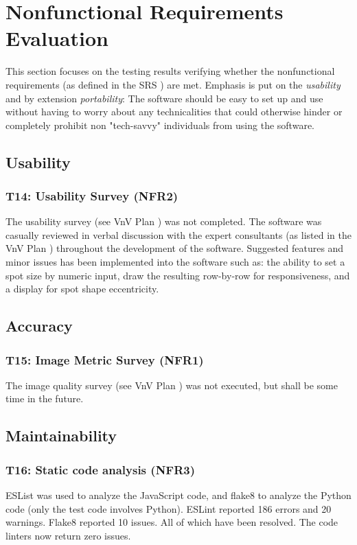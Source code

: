 \documentclass[12pt, titlepage]{article}
\begin{document}
\newpage
\clearpage

\section{Nonfunctional Requirements Evaluation}
This section focuses on the testing results verifying whether the nonfunctional requirements
(as defined in the SRS \cite{SRS}) are met. Emphasis is put on the \textit{usability} and
by extension \textit{portability}: The software should be easy to set up and use without
having to worry about any technicalities that could otherwise hinder or completely
prohibit non "tech-savvy" individuals from using the software.

\subsection{Usability} \label{ss_usability}
\subsubsection{T14: Usability Survey (NFR2)}
The usability survey (see VnV Plan \cite{VnV_plan}) was not completed.
The software was casually reviewed in verbal discussion
with the expert consultants (as listed in the VnV Plan \cite{VnV_plan})
throughout the development of the software. Suggested features and minor issues has been
implemented into the software such as: the ability to set a spot size by numeric input,
draw the resulting row-by-row for responsiveness, and a display for spot shape eccentricity.

\subsection{Accuracy} \label{ss_accuracy}
\subsubsection{T15: Image Metric Survey (NFR1)}
The image quality survey (see VnV Plan \cite{VnV_plan}) was not executed, but shall be some time in the future.

\subsection{Maintainability} \label{ss_maintain}
\subsubsection{T16: Static code analysis (NFR3)}
ESList was used to analyze the JavaScript code, and flake8 to analyze the Python code (only the
test code involves Python). ESLint reported 186 errors and 20 warnings. Flake8 reported
10 issues. All of which have been resolved. The code linters now return zero issues.
\end{document}
